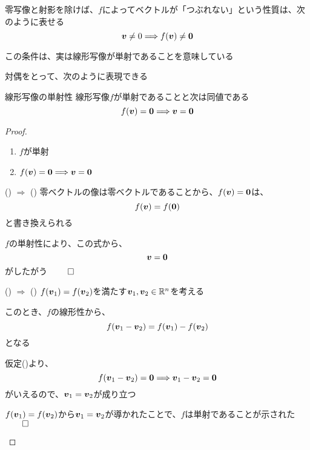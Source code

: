 \documentclass[../../../topic_linear-algebra]{subfiles}
\begin{document}
\sectionline

零写像と射影を除けば、$f$によってベクトルが「つぶれない」という性質は、次のように表せる
\begin{equation*}
  \vb*{v} \neq 0 \Longrightarrow f(\vb*{v}) \neq \vb*{0}
\end{equation*}


この条件は、実は線形写像が単射であることを意味している

対偶をとって、次のように表現できる

\begin{theorem}{線形写像の単射性}
  線形写像$f$が単射であることと次は同値である
  \begin{equation*}
    f(\vb*{v}) = \vb*{0} \Longrightarrow \vb*{v} = \vb*{0}
  \end{equation*}
\end{theorem}

\begin{proof}
  \begin{enumerate}[label=\romanlabel]
    \item $f$が単射
    \item $f(\vb*{v}) = \vb*{0} \Longrightarrow \vb*{v} = \vb*{0}$
  \end{enumerate}

  \begin{subpattern}{() $\Longrightarrow$ ()}
    零ベクトルの像は零ベクトルであることから、$f(\vb*{v}) = \vb*{0}$は、
    \begin{equation*}
      f(\vb*{v}) = f(\vb*{0})
    \end{equation*}
    と書き換えられる

    $f$の単射性により、この式から、
    \begin{equation*}
      \vb*{v} = \vb*{0}
    \end{equation*}
    がしたがう $\qed$
  \end{subpattern}

  \begin{subpattern}{() $\Longrightarrow$ ()}
    $f(\vb*{v}_1) = f(\vb*{v}_2)$を満たす$\vb*{v}_1, \vb*{v}_2 \in \mathbb{R}^n$を考える

    このとき、$f$の線形性から、
    \begin{equation*}
      f(\vb*{v}_1 - \vb*{v}_2) = f(\vb*{v}_1) - f(\vb*{v}_2)
    \end{equation*}
    となる

    仮定()より、
    \begin{equation*}
      f(\vb*{v}_1 - \vb*{v}_2) = \vb*{0} \Longrightarrow \vb*{v}_1 - \vb*{v}_2 = \vb*{0}
    \end{equation*}
    がいえるので、$\vb*{v}_1 = \vb*{v}_2$が成り立つ

    $f(\vb*{v}_1) = f(\vb*{v}_2)$から$\vb*{v}_1 = \vb*{v}_2$が導かれたことで、$f$は単射であることが示された $\qed$
  \end{subpattern}
\end{proof}
\end{document}

